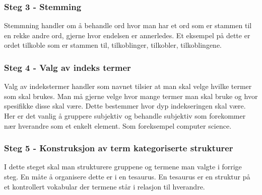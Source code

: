 \subsubsection*{Steg 3 - Stemming}
Stemmning handler om å behandle ord hvor man har et ord som er stammen til en rekke andre ord, gjerne hvor endelsen er annerledes. Et eksempel på dette er ordet tilkoble som er stammen til, tilkoblinger, tilkobler, tilkoblingene.

\subsubsection*{Steg 4 - Valg av indeks termer}
Valg av indekstermer handler som navnet tilsier at man skal velge hvilke termer som skal brukes. Man må gjerne velge hvor mange termer man skal bruke og hvor spesifikke disse skal være. Dette bestemmer hvor dyp indekseringen skal være.
Her er det vanlig å gruppere subjektiv og behandle subjektiv som forekommer nær hverandre som et enkelt element. Som foreksempel computer science.

\subsubsection*{Steg 5 - Konstruksjon av term kategoriserte strukturer}
I dette steget skal man strukturere gruppene og termene man valgte i forrige steg. En måte å organisere dette er i en tesaurus. En tesaurus er en struktur på et kontrollert vokabular der termene står i relasjon til hverandre.
